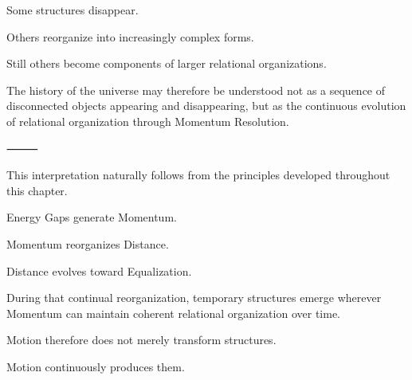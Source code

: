 Some structures disappear.

Others reorganize into increasingly complex forms.

Still others become components of larger relational organizations.

The history of the universe may therefore be understood not as a sequence of disconnected objects appearing and disappearing, but as the continuous evolution of relational organization through Momentum Resolution.

⸻

This interpretation naturally follows from the principles developed throughout this chapter.

Energy Gaps generate Momentum.

Momentum reorganizes Distance.

Distance evolves toward Equalization.

During that continual reorganization, temporary structures emerge wherever Momentum can maintain coherent relational organization over time.

Motion therefore does not merely transform structures.

Motion continuously produces them.
